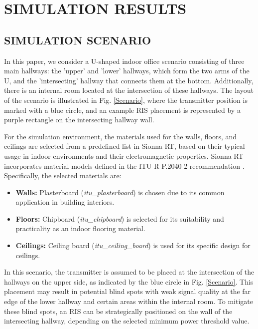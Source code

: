 \documentclass{IEEEoj}
\begin{document}
\section{SIMULATION RESULTS} \label{sec:results}

\subsection{SIMULATION SCENARIO}
In this paper, we consider a U-shaped indoor office scenario consisting of three main hallways: the 'upper' and 'lower' hallways, which form the two arms of the U, and the 'intersecting' hallway that connects them at the bottom. Additionally, there is an internal room located at the intersection of these hallways. The layout of the scenario is illustrated in Fig. \ref{Scenario}, where the transmitter position is marked with a blue circle, and an example RIS placement is represented by a purple rectangle on the intersecting hallway wall.

For the simulation environment, the materials used for the walls, floors, and ceilings are selected from a predefined list in Sionna RT, based on their typical usage in indoor environments and their electromagnetic properties. Sionna RT incorporates material models defined in the ITU-R P.2040-2 recommendation \cite{ITU}. Specifically, the selected materials are:  
\begin{itemize}
	\item \textbf{Walls:} Plasterboard (\textit{itu\_plasterboard}) is chosen due to its common application in building interiors.
	\item \textbf{Floors:} Chipboard (\textit{itu\_chipboard}) is selected for its suitability and practicality as an indoor flooring material.
	\item \textbf{Ceilings:} Ceiling board (\textit{itu\_ceiling\_board}) is used for its specific design for ceilings.
\end{itemize}

In this scenario, the transmitter is assumed to be placed at the intersection of the hallways on the upper side, as indicated by the blue circle in Fig. \ref{Scenario}. This placement may result in potential blind spots with weak signal quality at the far edge of the lower hallway and certain areas within the internal room. To mitigate these blind spots, an RIS can be strategically positioned on the wall of the intersecting hallway, depending on the selected minimum power threshold value.
\end{document}
